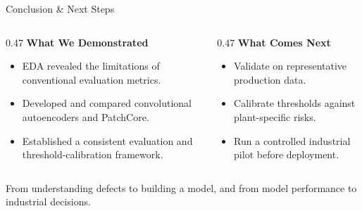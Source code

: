 \documentclass[aspectratio=169,10pt]{beamer}
\begin{document}
\begin{frame}{Conclusion \& Next Steps}
  \begin{columns}[T,onlytextwidth]
    \begin{column}{0.47\textwidth}
      \textbf{\color{teal}What We Demonstrated}
      \begin{itemize}\small
        \setlength{\itemsep}{7pt}
        \item EDA revealed the limitations of conventional evaluation metrics.
        \item Developed and compared convolutional autoencoders and PatchCore.
        \item Established a consistent evaluation and threshold-calibration framework.
      \end{itemize}
    \end{column}
    \begin{column}{0.47\textwidth}
      \textbf{\color{teal}What Comes Next}
      \begin{itemize}\small
        \setlength{\itemsep}{7pt}
        \item Validate on representative production data.
        \item Calibrate thresholds against plant-specific risks.
        \item Run a controlled industrial pilot before deployment.
      \end{itemize}
    \end{column}
  \end{columns}
  \vspace{4pt}
  {\small\centering From understanding defects to building a model, and from model performance to industrial decisions.\par}
  \vspace{2pt}
  \begin{center}
  \end{center}
\end{frame}
\end{document}
